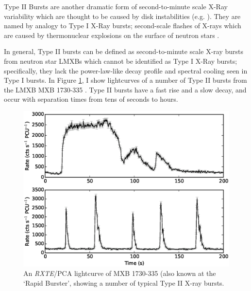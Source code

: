 \par Type II Bursts are another dramatic form of second-to-minute scale X-Ray variability which are thought to be caused by disk instabilities (e.g. \citealp{Lewin_TypeII}).  They are named by analogy to Type I X-Ray bursts; second-scale flashes of X-rays which are caused by thermonuclear explosions on the surface of neutron stars \citep{vanParadijs_TypeI,Lewin_Bursts}.
\par In general, Type II bursts can be defined as second-to-minute scale X-ray bursts from neutron star LMXBs which cannot be identified as Type I X-Ray bursts; specifically, they lack the power-law-like decay profile \citep{intZand_Decay} and spectral cooling \citep{Hoffman_T1Cool} seen in Type I bursts.  In Figure \ref{fig:BgB}, I show lightcurves of a number of Type II bursts from the LMXB MXB 1730-335 \citep{Bagnoli_PopStudy}.  Type II bursts have a fast rise and a slow decay, and occur with separation times from tens of seconds to hours.

\begin{figure}
  \centering
  \includegraphics[width=.9\linewidth, trim= 0mm 0mm 0mm 80mm,clip]{images/bagnoli_bursts.eps}
  \caption[An \textit{RXTE}/PCA lightcurve of the Rapid Burster, showing a number of typical Type II X-ray bursts.]{An \textit{RXTE}/PCA lightcurve of MXB 1730-335 (also known at the `Rapid Burster', showing a number of typical Type II X-ray bursts.}
  \label{fig:BgB}
\end{figure}

